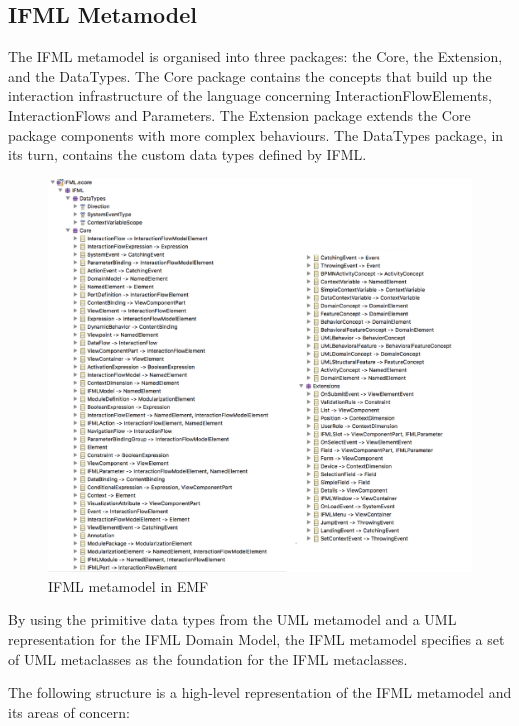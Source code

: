 \subsection{IFML Metamodel}

The IFML metamodel is organised into three packages: the Core, the Extension, and the DataTypes. The Core package contains the concepts that build up the interaction infrastructure of the language concerning InteractionFlowElements, InteractionFlows and Parameters. The Extension package extends the Core package components with more complex behaviours. The DataTypes package, in its turn, contains the custom data types defined by IFML.

\vspace{0.5cm}
\begin{figure}[H]
  \centering
    \includegraphics[width=16cm]{images/diagrams/ifml-ecore.png}
  \caption{IFML metamodel in EMF}
  \label{fig:ifml-ecore-representation}
\end{figure}
\vspace{0.5cm}

By using the primitive data types from the UML metamodel and a UML representation for the IFML Domain Model, the IFML metamodel specifies a set of UML metaclasses as the foundation for the IFML metaclasses.

\newpage
The following structure is a high-level representation of the IFML metamodel and its areas of concern:

